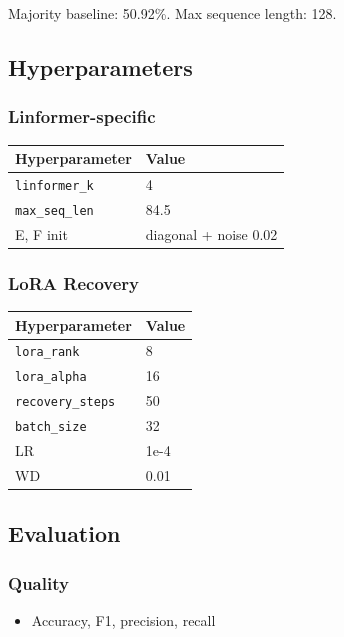 Majority baseline: 50.92\%. Max sequence length: 128.

\subsection{Hyperparameters}

\subsubsection{Linformer-specific}

\begin{table}[H]
\centering
\small
\begin{tabular}{ll}
\toprule
\textbf{Hyperparameter} & \textbf{Value} \\
\midrule
\texttt{linformer\_k} & 4 \\
\texttt{max\_seq\_len} & 84.5 \\
E, F init & diagonal + noise 0.02 \\
\bottomrule
\end{tabular}
\end{table}

\subsubsection{LoRA Recovery}

\begin{table}[H]
\centering
\small
\begin{tabular}{ll}
\toprule
\textbf{Hyperparameter} & \textbf{Value} \\
\midrule
\texttt{lora\_rank} & 8 \\
\texttt{lora\_alpha} & 16 \\
\texttt{recovery\_steps} & 50 \\
\texttt{batch\_size} & 32 \\
LR & 1e-4 \\
WD & 0.01 \\
\bottomrule
\end{tabular}
\end{table}

\subsection{Evaluation}

\subsubsection{Quality}
\begin{itemize}
\item Accuracy, F1, precision, recall

\end{itemize}
